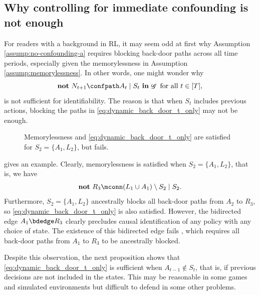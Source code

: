 \documentclass[12pt,a4paper]{article}
\theoremstyle{definition}
\newcommand{\ingraph}[1]{~\textnormal{\bf in}\,#1}
\newcommand{\textnot}{\textnormal{\bf not}~}
\DeclareMathOperator{\gG}{\mathscr{G}}
\begin{document}
\subsection{Why controlling for immediate confounding is not enough}
For readers with a background in RL, it may seem odd at first why
Assumption \ref{assump:no-confounding-a} requires blocking back-door
paths across all time periods, especially given the memorylessness in
Assumption \ref{assump:memorylessness}. In other words, one might
wonder why
\begin{equation}\label{eq:dynamic_back_door_t_only}
    \textnot N_{t+1} \confpath A_t \mid S_t \ingraph{\gG} ~ \text{for all $t \in [T]$},
\end{equation}
is not sufficient for identifiability. The reason is that when $S_t$
includes previous actions, blocking the paths in
\eqref{eq:dynamic_back_door_t_only} may not be enough.
\begin{figure}[t]
  \centering
  \caption{Memorylessness and \eqref{eq:dynamic_back_door_t_only} are
    satisfied for $S_2 = \{A_1, L_2\}$, but
     fails.}
  \label{fig:d-SWIG-2a-explained}
\end{figure}
 gives an example. Clearly,
memorylessness is satisfied when $S_2 = \{A_1, L_2\}$, that is, we
have
\[
    \textnot R_3 \mconn (L_1 \cup A_1) \setminus S_2 \mid S_2.
\]
Furthermore, $S_2 = \{A_1, L_2\}$ ancestrally blocks all back-door
paths from $A_2$ to $R_3$, so \eqref{eq:dynamic_back_door_t_only} is
also satisfied. However, the bidirected edge $A_1 \bdedge R_3$ clearly
precludes causal identification of any policy with any choice of
state. The existence of this
bidirected edge fails , which requires
all back-door paths from $A_1$ to $R_3$ to be ancestrally blocked.

Despite this observation, the next proposition shows that
\eqref{eq:dynamic_back_door_t_only} is sufficient when $A_{t-1} \notin
S_t$, that is, if previous decisions are not included in the
states. This may be reasonable in some games and simulated
environments but difficult to defend in some other problems.
\end{document}
